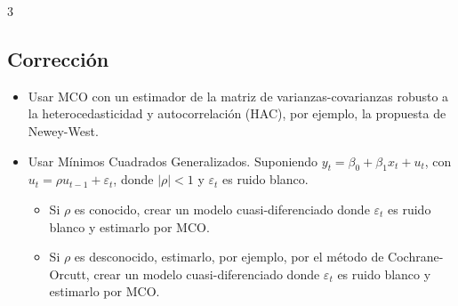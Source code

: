 \documentclass[10pt, a4paper, landscape]{article}
\begin{document}
\begin{multicols}{3}
\subsection*{Corrección}

\begin{itemize}[leftmargin=*]
	\item Usar MCO con un estimador de la matriz de varianzas-covarianzas robusto a la heterocedasticidad y autocorrelación (HAC), por ejemplo, la propuesta de Newey-West.
	\item Usar Mínimos Cuadrados Generalizados. Suponiendo \( y_{t} = \beta_{0} + \beta_{1} x_{t} + u_{t} \), con \( u_{t} = \rho u_{t - 1} + \varepsilon_{t} \), donde \( \lvert \rho \rvert < 1 \) y \( \varepsilon_{t} \) es ruido blanco.
	\begin{itemize}[leftmargin=*]
		\item Si \( \rho \) es conocido, crear un modelo cuasi-diferenciado donde \( \varepsilon_{t} \) es ruido blanco y estimarlo por MCO.
		\item Si \( \rho \) es desconocido, estimarlo, por ejemplo, por el método de Cochrane-Orcutt, crear un modelo cuasi-diferenciado donde \( \varepsilon_{t} \) es ruido blanco y estimarlo por MCO.
	\end{itemize}
\end{itemize}

\end{multicols}
\end{document}

